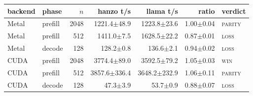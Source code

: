 \begin{tabular}{@{}llrrrrl@{}}
\toprule
backend & phase & $n$ & hanzo t/s & llama t/s & ratio & verdict \\
\midrule
Metal & prefill & 2048 & 1221.4$\pm$48.9 & 1223.8$\pm$23.6 & 1.00$\pm$0.04 & \textsc{parity} \\
Metal & prefill & 512 & 1411.0$\pm$7.5 & 1628.5$\pm$22.2 & 0.87$\pm$0.01 & \textsc{loss} \\
Metal & decode & 128 & 128.2$\pm$0.8 & 136.6$\pm$2.1 & 0.94$\pm$0.02 & \textsc{loss} \\
CUDA & prefill & 2048 & 3774.4$\pm$89.0 & 3592.5$\pm$79.2 & 1.05$\pm$0.03 & \textsc{win} \\
CUDA & prefill & 512 & 3857.6$\pm$336.4 & 3648.2$\pm$232.9 & 1.06$\pm$0.11 & \textsc{parity} \\
CUDA & decode & 128 & 47.3$\pm$3.9 & 53.7$\pm$0.9 & 0.88$\pm$0.07 & \textsc{loss} \\
\bottomrule
\end{tabular}
